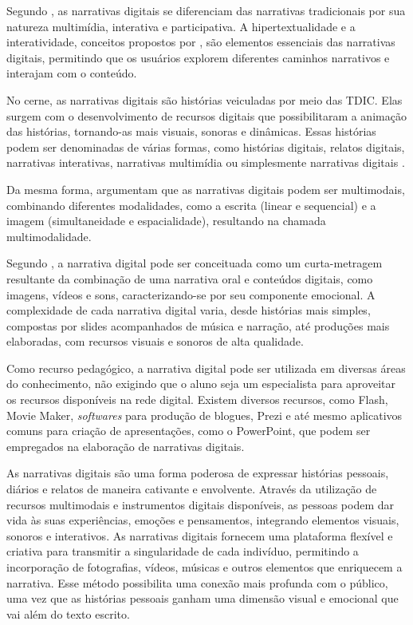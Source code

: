 \documentclass[portuguese]{textolivre}
\begin{document}
Segundo \textcite{ryan2009narrative}, as narrativas digitais se diferenciam das narrativas tradicionais por sua natureza multimídia, interativa e participativa. A hipertextualidade e a interatividade, conceitos propostos por \textcite{landow1992hypertext}, são elementos essenciais das narrativas digitais, permitindo que os usuários explorem diferentes caminhos narrativos e interajam com o conteúdo.

No cerne, as narrativas digitais são histórias veiculadas por meio das TDIC. Elas surgem com o desenvolvimento de recursos digitais que possibilitaram a animação das histórias, tornando-as mais visuais, sonoras e dinâmicas. Essas histórias podem ser denominadas de várias formas, como histórias digitais, relatos digitais, narrativas interativas, narrativas multimídia ou simplesmente narrativas digitais \cite{almeidade2012integraccao, coscarelli2016letramento}.

Da mesma forma, \textcite{almeidade2012integraccao} argumentam que as narrativas digitais podem ser multimodais, combinando diferentes modalidades, como a escrita (linear e sequencial) e a imagem (simultaneidade e espacialidade), resultando na chamada multimodalidade.

Segundo \textcite{damiani2013discutindo}, a narrativa digital pode ser conceituada como um curta-metragem resultante da combinação de uma narrativa oral e conteúdos digitais, como imagens, vídeos e sons, caracterizando-se por seu componente emocional. A complexidade de cada narrativa digital varia, desde histórias mais simples, compostas por slides acompanhados de música e narração, até produções mais elaboradas, com recursos visuais e sonoros de alta qualidade.

Como recurso pedagógico, a narrativa digital pode ser utilizada em diversas áreas do conhecimento, não exigindo que o aluno seja um especialista para aproveitar os recursos disponíveis na rede digital. Existem diversos recursos, como Flash, Movie Maker, \emph{softwares} para produção de blogues, Prezi e até mesmo aplicativos comuns para criação de apresentações, como o PowerPoint, que podem ser empregados na elaboração de narrativas digitais.

As narrativas digitais são uma forma poderosa de expressar histórias pessoais, diários e relatos de maneira cativante e envolvente. Através da utilização de recursos multimodais e instrumentos digitais disponíveis, as pessoas podem dar vida às suas experiências, emoções e pensamentos, integrando elementos visuais, sonoros e interativos. As narrativas digitais fornecem uma plataforma flexível e criativa para transmitir a singularidade de cada indivíduo, permitindo a incorporação de fotografias, vídeos, músicas e outros elementos que enriquecem a narrativa. Esse método possibilita uma conexão mais profunda com o público, uma vez que as histórias pessoais ganham uma dimensão visual e emocional que vai além do texto escrito.
\end{document}
